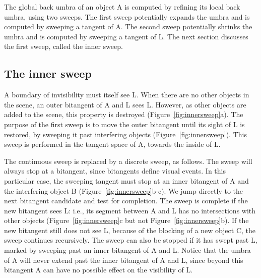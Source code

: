 \documentclass[9pt,twocolumn]{article}
\begin{document}
The global back umbra of an object A is computed by refining its local back umbra,
using two sweeps.
The first sweep potentially expands the umbra and is computed by sweeping a tangent of A.
The second sweep potentially shrinks the umbra and is computed by sweeping a tangent of L.
The next section discusses the first sweep, called the inner sweep.




\subsection{The inner sweep}
\label{sec:innersweep}


A boundary of invisibility must itself see L.
When there are no other objects in the scene, an outer bitangent of A and L sees L.
However, as other objects are added to the scene, this property is destroyed
(Figure~\ref{fig:innersweep}a).
The purpose of the first sweep is to move the outer bitangent until its sight of L 
is restored,
by sweeping it past interfering objects (Figure~\ref{fig:innersweep}).
This sweep is performed in the tangent space of A, towards the inside of L.

The continuous sweep is replaced by a discrete sweep, as follows.
The sweep will always stop at a bitangent, since bitangents define visual events.
In this particular case, the sweeping tangent must stop at an inner bitangent
of A and the interfering object B (Figure~\ref{fig:innersweep}b-c).
We jump directly to the next bitangent candidate and test for completion.
The sweep is complete if the new bitangent sees L:
i.e., its segment between A and L has no intersections with other objects
(Figure~\ref{fig:innersweep}c but not Figure~\ref{fig:innersweep}b).
If the new bitangent still does not see L, because of the blocking of a new object C,
the sweep continues recursively.
The sweep can also be stopped if it has swept past L, marked by
sweeping past an inner bitangent of A and L.
Notice that the umbra of A will never extend past the inner bitangent of A and L,
since beyond this bitangent A can have no possible effect on the visibility of L.
\end{document}
